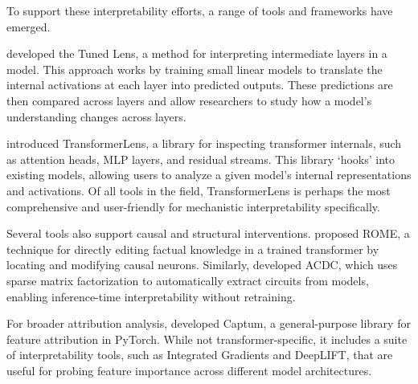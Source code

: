 To support these interpretability efforts, a range of tools and frameworks have emerged.

\citet{belrose2023eliciting} developed the Tuned Lens, a method for interpreting intermediate layers in a model. This approach works by training small linear models to translate the internal activations at each layer into predicted outputs. These predictions are then compared across layers and allow researchers to study how a model's understanding changes across layers.

\citet{nanda2022transformerlens} introduced TransformerLens, a library for inspecting transformer internals, such as attention heads, MLP layers, and residual streams. This library `hooks' into existing models, allowing users to analyze a given model's internal representations and activations. Of all tools in the field, TransformerLens is perhaps the most comprehensive and user-friendly for mechanistic interpretability specifically.

Several tools also support causal and structural interventions. \citet{meng2022locating} proposed ROME, a technique for directly editing factual knowledge in a trained transformer by locating and modifying causal neurons. Similarly, \citet{conmy2023towards} developed ACDC, which uses sparse matrix factorization to automatically extract circuits from models, enabling inference-time interpretability without retraining.

For broader attribution analysis, \citet{kokhlikyan2020captum} developed Captum, a general-purpose library for feature attribution in PyTorch. While not transformer-specific, it includes a suite of interpretability tools, such as Integrated Gradients and DeepLIFT, that are useful for probing feature importance across different model architectures.



